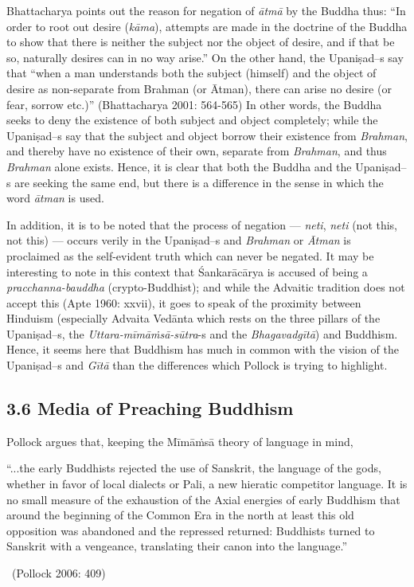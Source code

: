 Bhattacharya points out the reason for negation of \textit{ātmā} by the Buddha thus: “In order to root out desire (\textit{kāma}), attempts are made in the doctrine of the Buddha to show that there is neither the subject nor the object of desire, and if that be so, naturally desires can in no way arise.” On the other hand, the Upaniṣad--s say that “when a man understands both the subject (himself) and the object of desire as non-separate from Brahman (or Ātman), there can arise no desire (or fear, sorrow etc.)” (Bhattacharya 2001: 564-565) In other words, the Buddha seeks to deny the existence of both subject and object completely; while the Upaniṣad--s say that the subject and object borrow their existence from \textit{Brahman}, and thereby have no existence of their own, separate from \textit{Brahman}, and thus \textit{Brahman} alone exists. Hence, it is clear that both the Buddha and the Upaniṣad--s are seeking the same end, but there is a difference in the sense in which the word \textit{ātman} is used.

In addition, it is to be noted that the process of negation — \textit{neti}, \textit{neti} (not this, not this) — occurs verily in the Upaniṣad--s and \textit{Brahman} or \textit{Ātman} is proclaimed as the self-evident truth which can never be negated. It may be interesting to note in this context that Śankarācārya is accused of being a \textit{pracchanna-bauddha }(crypto-Buddhist); and while the Advaitic tradition does not accept this (Apte 1960: xxvii), it goes to speak of the proximity between Hinduism (especially Advaita Vedānta which rests on the three pillars of the Upaniṣad--s, the \textit{Uttara-mīmāṁsā-sūtra}-s and the \textit{Bhagavadgītā}) and Buddhism. Hence, it seems here that Buddhism has much in common with the vision of the Upaniṣad--s and \textit{Gītā} than the differences which Pollock is trying to highlight.

\newpage

\subsection*{3.6 Media of Preaching Buddhism}

Pollock argues that, keeping the Mīmāṁsā theory of language in mind,

\begin{myquote}
“...the early Buddhists rejected the use of Sanskrit, the language of the gods, whether in favor of local dialects or Pali, a new hieratic competitor language. It is no small measure of the exhaustion of the Axial energies of early Buddhism that around the beginning of the Common Era in the north at least this old opposition was abandoned and the repressed returned: Buddhists turned to Sanskrit with a vengeance, translating their canon into the language.” 

~\hfill (Pollock 2006: 409)
\end{myquote}

